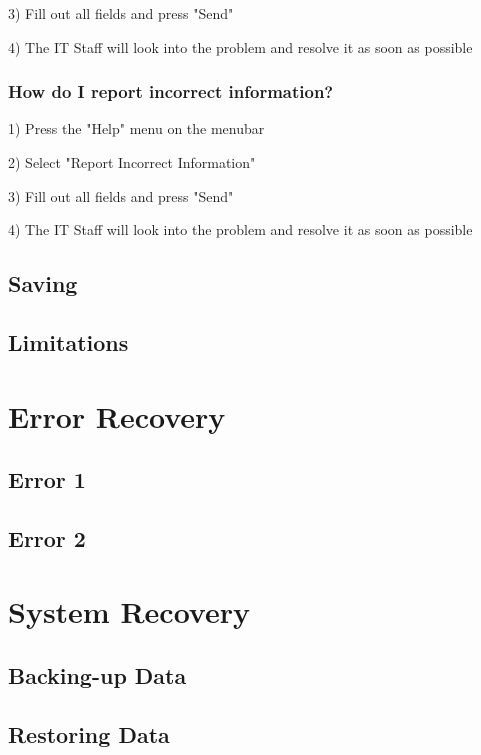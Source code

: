 3) Fill out all fields and press "Send"

4) The IT Staff will look into the problem and resolve it as soon as possible

\subsubsection{How do I report incorrect information?}

1) Press the "Help" menu on the menubar

2) Select "Report Incorrect Information"

3) Fill out all fields and press "Send"

4) The IT Staff will look into the problem and resolve it as soon as possible

\subsection{Saving}

\subsection{Limitations}

\section{Error Recovery}

\subsection{Error 1}

\subsection{Error 2}

\section{System Recovery}

\subsection{Backing-up Data}

\subsection{Restoring Data}